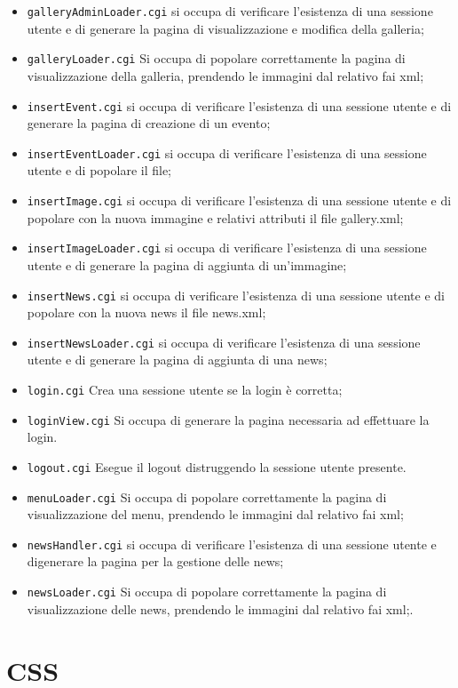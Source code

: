 \begin{itemize}
\item \texttt{galleryAdminLoader.cgi} si occupa di verificare l'esistenza di una sessione utente e di generare la pagina di visualizzazione e modifica della galleria;
\item \texttt{galleryLoader.cgi} Si occupa di popolare correttamente la pagina di visualizzazione della galleria, prendendo le immagini dal relativo fai xml;
\item \texttt{insertEvent.cgi} si occupa di verificare l'esistenza di una sessione utente e di generare la pagina di creazione di un evento;
\item \texttt{insertEventLoader.cgi} si occupa di verificare l'esistenza di una sessione utente e di popolare il file;
\item \texttt{insertImage.cgi}  si occupa di verificare l'esistenza di una sessione utente e di popolare con la nuova immagine e relativi attributi il file gallery.xml;
\item \texttt{insertImageLoader.cgi} si occupa di verificare l'esistenza di una sessione utente e di generare la pagina di aggiunta di un'immagine;
\item \texttt{insertNews.cgi} si occupa di verificare l'esistenza di una sessione utente e di popolare con la nuova news il file news.xml;
\item \texttt{insertNewsLoader.cgi} si occupa di verificare l'esistenza di una sessione utente e di generare la pagina di aggiunta di una news;
\item \texttt{login.cgi} Crea una sessione utente se la login è corretta;
\item \texttt{loginView.cgi} Si occupa di generare la pagina necessaria ad effettuare la login.
\item \texttt{logout.cgi} Esegue il logout distruggendo la sessione utente presente.
\item \texttt{menuLoader.cgi} Si occupa di popolare correttamente la pagina di visualizzazione del menu, prendendo le immagini dal relativo fai xml;
\item \texttt{newsHandler.cgi} si occupa di verificare l'esistenza di una sessione utente e digenerare la pagina per la gestione delle news;
\item \texttt{newsLoader.cgi} Si occupa di popolare correttamente la pagina di visualizzazione delle news, prendendo le immagini dal relativo fai xml;.
\end{itemize} 

\section{CSS}

